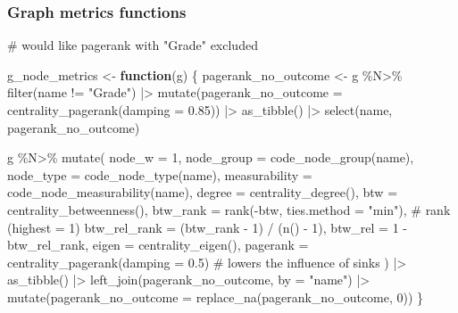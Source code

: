 \documentclass[
  letterpaper,
  DIV=11,
  numbers=noendperiod]{scrartcl}
\newenvironment{Shaded}{\begin{snugshade}}{\end{snugshade}}
\newcommand{\AttributeTok}[1]{\textcolor[rgb]{0.40,0.45,0.13}{#1}}
\newcommand{\CommentTok}[1]{\textcolor[rgb]{0.37,0.37,0.37}{#1}}
\newcommand{\ControlFlowTok}[1]{\textcolor[rgb]{0.00,0.23,0.31}{\textbf{#1}}}
\newcommand{\DecValTok}[1]{\textcolor[rgb]{0.68,0.00,0.00}{#1}}
\newcommand{\FloatTok}[1]{\textcolor[rgb]{0.68,0.00,0.00}{#1}}
\newcommand{\FunctionTok}[1]{\textcolor[rgb]{0.28,0.35,0.67}{#1}}
\newcommand{\NormalTok}[1]{\textcolor[rgb]{0.00,0.23,0.31}{#1}}
\newcommand{\OtherTok}[1]{\textcolor[rgb]{0.00,0.23,0.31}{#1}}
\newcommand{\SpecialCharTok}[1]{\textcolor[rgb]{0.37,0.37,0.37}{#1}}
\newcommand{\StringTok}[1]{\textcolor[rgb]{0.13,0.47,0.30}{#1}}
\begin{document}
\subsubsection{Graph metrics functions}\label{graph-metrics-functions}

\begin{Shaded}
\begin{Highlighting}[]
\CommentTok{\# would like pagerank with "Grade" excluded}

\NormalTok{g\_node\_metrics }\OtherTok{\textless{}{-}} \ControlFlowTok{function}\NormalTok{(g) \{}
\NormalTok{    pagerank\_no\_outcome }\OtherTok{\textless{}{-}} 
\NormalTok{        g }\SpecialCharTok{\%N\textgreater{}\%}
        \FunctionTok{filter}\NormalTok{(name }\SpecialCharTok{!=} \StringTok{"Grade"}\NormalTok{) }\SpecialCharTok{|\textgreater{}} 
        \FunctionTok{mutate}\NormalTok{(}\AttributeTok{pagerank\_no\_outcome =} \FunctionTok{centrality\_pagerank}\NormalTok{(}\AttributeTok{damping =} \FloatTok{0.85}\NormalTok{)) }\SpecialCharTok{|\textgreater{}} 
        \FunctionTok{as\_tibble}\NormalTok{() }\SpecialCharTok{|\textgreater{}} 
        \FunctionTok{select}\NormalTok{(name, pagerank\_no\_outcome)}
        
\NormalTok{    g }\SpecialCharTok{\%N\textgreater{}\%}
        \FunctionTok{mutate}\NormalTok{(}
            \AttributeTok{node\_w =} \DecValTok{1}\NormalTok{,}
            \AttributeTok{node\_group =} \FunctionTok{code\_node\_group}\NormalTok{(name),}
            \AttributeTok{node\_type =} \FunctionTok{code\_node\_type}\NormalTok{(name),}
            \AttributeTok{measurability =} \FunctionTok{code\_node\_measurability}\NormalTok{(name),}
            \AttributeTok{degree =} \FunctionTok{centrality\_degree}\NormalTok{(),}
            \AttributeTok{btw =} \FunctionTok{centrality\_betweenness}\NormalTok{(),}
            \AttributeTok{btw\_rank =} \FunctionTok{rank}\NormalTok{(}\SpecialCharTok{{-}}\NormalTok{btw, }\AttributeTok{ties.method =} \StringTok{"min"}\NormalTok{),   }\CommentTok{\# rank (highest = 1)}
            \AttributeTok{btw\_rel\_rank =}\NormalTok{ (btw\_rank }\SpecialCharTok{{-}} \DecValTok{1}\NormalTok{) }\SpecialCharTok{/}\NormalTok{ (}\FunctionTok{n}\NormalTok{() }\SpecialCharTok{{-}} \DecValTok{1}\NormalTok{),}
            \AttributeTok{btw\_rel =} \DecValTok{1} \SpecialCharTok{{-}}\NormalTok{ btw\_rel\_rank,}
            \AttributeTok{eigen =} \FunctionTok{centrality\_eigen}\NormalTok{(),}
            \AttributeTok{pagerank =} \FunctionTok{centrality\_pagerank}\NormalTok{(}\AttributeTok{damping =} \FloatTok{0.5}\NormalTok{) }\CommentTok{\# lowers the influence of sinks}
\NormalTok{        ) }\SpecialCharTok{|\textgreater{}} 
        \FunctionTok{as\_tibble}\NormalTok{() }\SpecialCharTok{|\textgreater{}} 
        \FunctionTok{left\_join}\NormalTok{(pagerank\_no\_outcome, }\AttributeTok{by =} \StringTok{"name"}\NormalTok{) }\SpecialCharTok{|\textgreater{}} 
        \FunctionTok{mutate}\NormalTok{(}\AttributeTok{pagerank\_no\_outcome =} \FunctionTok{replace\_na}\NormalTok{(pagerank\_no\_outcome, }\DecValTok{0}\NormalTok{))}
\NormalTok{\}}
\end{Highlighting}
\end{Shaded}
\end{document}
